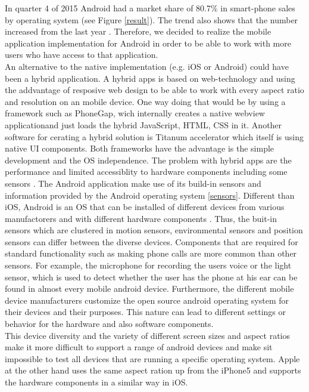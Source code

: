 In quarter 4 of 2015 Android had a market share of 80.7\% in smart-phone sales by operating system (see Figure \ref{result}). The trend also shows that the number increased from the last year \cite{gartnerMobileOSMarketshare}. Therefore, we decided to realize the mobile application implementation for Android in order to be able to work with more users who have access to that application.\\
An alternative to the native implementation (e.g. iOS or Android) could have been a hybrid application. A hybrid apps is based on web-technology and using the addvantage of resposive web design to be able to work with every aspect ratio and resolution on an mobile device. One way doing that would be by using a framework such as PhoneGap, wich internally creates a native webview applicationand just loads the hybrid JavaScript, HTML, CSS in it. Another software for cerating a hybrid solution is Titanum accelerator which itself is using native UI components. Both frameworks have the advantage is the simple development and the OS independence. The problem with hybrid apps are the performance and limited accessiblity to hardware components including some sensors \cite{holzinger2012making}.  
\bigbreak
The Android application make use of its build-in sensors and information provided by the Android operating system \ref{sensors}. Different than iOS, Android is an OS that can be installed of different devices from various manufactorers and with different hardware components \cite{goadrich2011smart}. Thus, the buit-in sensors which are clustered in motion sensors, environmental sensors and position sensors \cite{androidDevelopers} can differ between the diverse devices. Components that are required for standard functionality such as making phone calls are more common than other sensors. For example, the microphone for recording the users voice or the light sensor, which is used to detect whether the user has the phone at his ear can be found in almost every mobile android device. 
Furthermore, the different mobile device manufacturers customize the open source android operating system for their devices and their purposes. This nature can lead to different settings or behavior for the hardware and also software components.\\
This device diversity and the variety of different screen sizes and aspect ratios make it more difficult to support a range of android devices and make sit impossible to test all devices that are running a specific operating system. Apple at the other hand uses the same aspect ration up from the iPhone5 and supports the hardware components in a similar way in iOS. 

